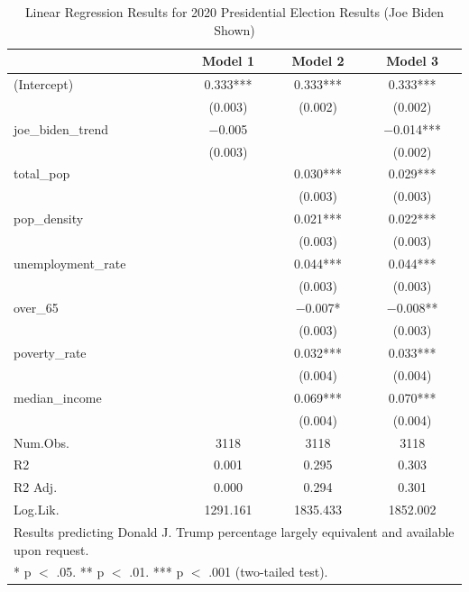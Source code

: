\documentclass[
]{article}
\begin{document}
\begin{table}

\caption{\label{tab:pres_2020_analysis}Linear Regression Results for 2020 Presidential Election Results (Joe Biden Shown)}
\centering
\begin{tabular}[t]{lccc}
\toprule
  & Model 1 & Model 2 & Model 3\\
\midrule
(Intercept) & \num{0.333}*** & \num{0.333}*** & \num{0.333}***\\
 & (\num{0.003}) & (\num{0.002}) & (\num{0.002})\\
joe\_biden\_trend & \num{-0.005} &  & \num{-0.014}***\\
 & (\num{0.003}) &  & (\num{0.002})\\
total\_pop &  & \num{0.030}*** & \num{0.029}***\\
 &  & (\num{0.003}) & \vphantom{3} (\num{0.003})\\
pop\_density &  & \num{0.021}*** & \num{0.022}***\\
 &  & (\num{0.003}) & \vphantom{2} (\num{0.003})\\
unemployment\_rate &  & \num{0.044}*** & \num{0.044}***\\
 &  & (\num{0.003}) & \vphantom{1} (\num{0.003})\\
over\_65 &  & \num{-0.007}* & \num{-0.008}**\\
 &  & (\num{0.003}) & (\num{0.003})\\
poverty\_rate &  & \num{0.032}*** & \num{0.033}***\\
 &  & (\num{0.004}) & \vphantom{1} (\num{0.004})\\
median\_income &  & \num{0.069}*** & \num{0.070}***\\
 &  & (\num{0.004}) & (\num{0.004})\\
\midrule
Num.Obs. & \num{3118} & \num{3118} & \num{3118}\\
R2 & \num{0.001} & \num{0.295} & \num{0.303}\\
R2 Adj. & \num{0.000} & \num{0.294} & \num{0.301}\\
Log.Lik. & \num{1291.161} & \num{1835.433} & \num{1852.002}\\
\bottomrule
\multicolumn{4}{l}{\rule{0pt}{1em}Results predicting Donald J. Trump percentage largely equivalent and available upon request.}\\
\multicolumn{4}{l}{\rule{0pt}{1em}* p $<$ .05. ** p $<$ .01. *** p $<$ .001 (two-tailed test).}\\
\end{tabular}
\end{table}
\end{document}
